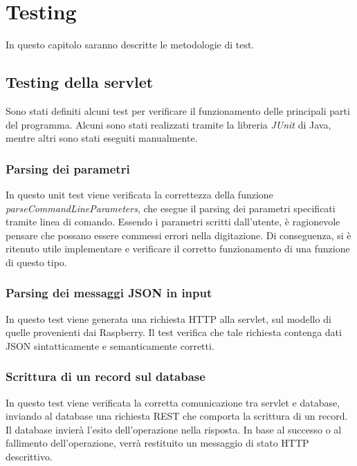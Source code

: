 \chapter{Testing}

In questo capitolo saranno descritte le metodologie di test.

\section{Testing della servlet}
Sono stati definiti alcuni test per verificare il funzionamento delle principali parti del programma.
Alcuni sono stati realizzati tramite la libreria \textit{JUnit} di Java, mentre altri sono stati eseguiti manualmente.

\subsection{Parsing dei parametri}
In questo unit test viene verificata la correttezza della funzione \textit{parseCommandLineParameters}, che esegue il parsing dei parametri specificati tramite linea di comando.
Essendo i parametri scritti dall'utente, è ragionevole pensare che possano essere commessi errori nella digitazione.
Di conseguenza, si è ritenuto utile implementare e verificare il corretto funzionamento di una funzione di questo tipo.

\subsection{Parsing dei messaggi JSON in input}
In questo test viene generata una richiesta HTTP alla servlet, sul modello di quelle provenienti dai Raspberry. Il test verifica che tale richiesta contenga dati JSON sintatticamente e semanticamente corretti.

\subsection{Scrittura di un record sul database}
In questo test viene verificata la corretta comunicazione tra servlet e database, inviando al database una richiesta REST che comporta la scrittura di un record.
Il database invierà l'esito dell'operazione nella risposta. In base al successo o al fallimento dell'operazione, verrà restituito un messaggio di stato HTTP descrittivo.

